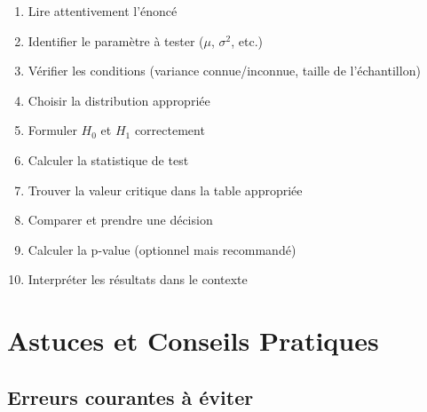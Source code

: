 \documentclass[11pt,a4paper]{article}
\begin{document}
\begin{enumerate}
    \item[$\square$] Lire attentivement l'énoncé
    \item[$\square$] Identifier le paramètre à tester ($\mu$, $\sigma^2$, etc.)
    \item[$\square$] Vérifier les conditions (variance connue/inconnue, taille de l'échantillon)
    \item[$\square$] Choisir la distribution appropriée
    \item[$\square$] Formuler $H_0$ et $H_1$ correctement
    \item[$\square$] Calculer la statistique de test
    \item[$\square$] Trouver la valeur critique dans la table appropriée
    \item[$\square$] Comparer et prendre une décision
    \item[$\square$] Calculer la p-value (optionnel mais recommandé)
    \item[$\square$] Interpréter les résultats dans le contexte
\end{enumerate}

\newpage

\section{Astuces et Conseils Pratiques}

\subsection{Erreurs courantes à éviter}
\end{document}
